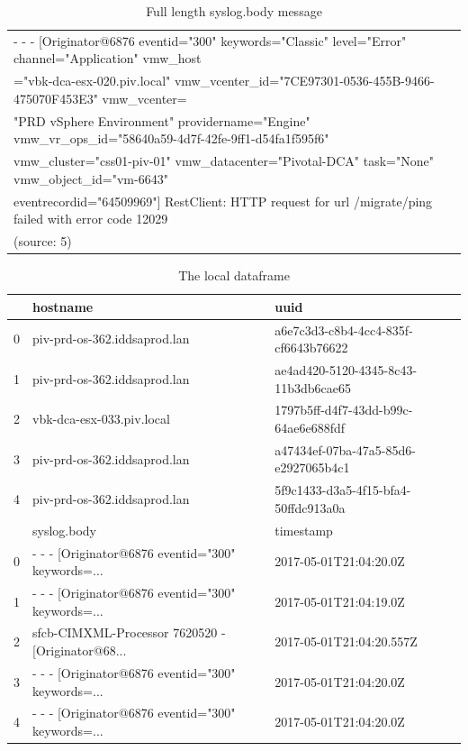 \begin{table}[h]
\centering
    \begin{tabular}{|l|} 
    \hline
    - - - [Originator@6876 eventid="300" keywords="Classic" level="Error" channel="Application" vmw\_host \\
    ="vbk-dca-esx-020.piv.local" vmw\_vcenter\_id="7CE97301-0536-455B-9466-475070F453E3" vmw\_vcenter= \\ 
    "PRD vSphere Environment" providername="Engine"  vmw\_vr\_ops\_id="58640a59-4d7f-42fe-9ff1-d54fa1f595f6" \\ vmw\_cluster="css01-piv-01" vmw\_datacenter="Pivotal-DCA" task="None"  vmw\_object\_id="vm-6643" \\ eventrecordid="64509969"] 
    RestClient: HTTP request for url /migrate/ping failed with error code 12029 \\ 
    (source: 5) \\
    \hline
    \end{tabular}
\caption{Full length syslog.body message}
\label{tab:tablemessage}
\end{table}


\begin{table}[h]
\centering
 \begin{tabular}{|l|l|l|} 
 \hline
  & hostname & uuid \\ [0.5ex] 
 \hline
 0 & piv-prd-os-362.iddsaprod.lan & a6e7c3d3-c8b4-4cc4-835f-cf6643b76622 \\
 1 & piv-prd-os-362.iddsaprod.lan &	ae4ad420-5120-4345-8c43-11b3db6cae65 \\
 2 & vbk-dca-esx-033.piv.local &	1797b5ff-d4f7-43dd-b99c-64ae6e688fdf \\
 3 & piv-prd-os-362.iddsaprod.lan &	a47434ef-07ba-47a5-85d6-e2927065b4c1 \\
 4 & piv-prd-os-362.iddsaprod.lan &	5f9c1433-d3a5-4f15-bfa4-50ffdc913a0a \\
 \hline\hline
  & syslog.body	& timestamp \\ 
 \hline
 0 & - - - [Originator@6876 eventid="300" keywords=...  & 2017-05-01T21:04:20.0Z \\
 1 & - - - [Originator@6876 eventid="300" keywords=...	& 2017-05-01T21:04:19.0Z \\
 2 & sfcb-CIMXML-Processor 7620520 - [Originator@68...	& 2017-05-01T21:04:20.557Z \\
 3 & - - - [Originator@6876 eventid="300" keywords=...	& 2017-05-01T21:04:20.0Z \\
 4 & - - - [Originator@6876 eventid="300" keywords=...	& 2017-05-01T21:04:20.0Z \\
 \hline
 \end{tabular}
\caption{The local dataframe}
\label{tab:tableerror}
\end{table}

